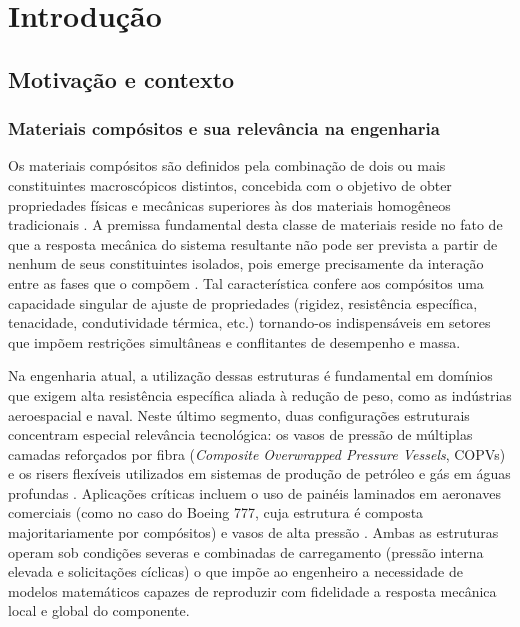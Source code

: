 \chapter{Introdução}

\section{Motivação e contexto}

\subsection{Materiais compósitos e sua relevância na engenharia}

Os materiais compósitos são definidos pela combinação de dois ou mais constituintes macroscópicos distintos, concebida com o objetivo de obter propriedades físicas e mecânicas superiores às dos materiais homogêneos tradicionais \cite{RMJones2018}. A premissa fundamental desta classe de
materiais reside no fato de que a resposta mecânica do sistema resultante não pode ser prevista a partir de nenhum de seus constituintes isolados, pois emerge precisamente da interação entre as fases que o compõem \cite{PartonReport}. Tal característica confere aos compósitos uma capacidade singular de ajuste de propriedades  (rigidez, resistência específica, tenacidade, condutividade térmica, etc.) tornando-os indispensáveis em setores que impõem restrições simultâneas e conflitantes de desempenho e massa.

Na engenharia atual, a utilização dessas estruturas é fundamental em domínios que exigem alta resistência específica aliada à redução de peso, como as indústrias aeroespacial e naval. Neste último segmento, duas configurações estruturais concentram especial relevância tecnológica: os vasos de pressão de múltiplas camadas reforçados por fibra (\textit{Composite Overwrapped Pressure Vessels}, COPVs) \cite[p.~1]{Zhang2022} e os risers flexíveis utilizados em sistemas de produção de petróleo e gás em águas profundas \cite{Liu2026}. Aplicações críticas incluem o uso de painéis laminados em aeronaves comerciais (como no caso do Boeing 777, cuja estrutura é composta majoritariamente por compósitos) e vasos de alta pressão \cite[p.~2]{Zhang2022}. Ambas as estruturas operam sob condições severas e combinadas de carregamento (pressão interna elevada e solicitações cíclicas) o que impõe ao engenheiro a necessidade de modelos matemáticos capazes de reproduzir com fidelidade a resposta mecânica local e global do componente.

